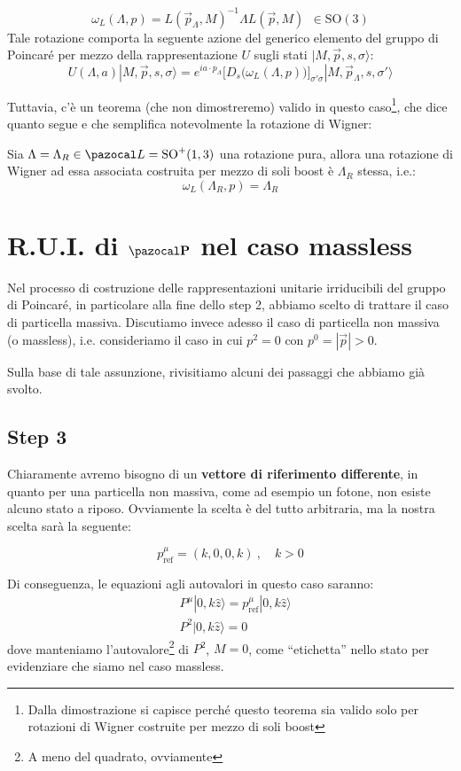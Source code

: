 \documentclass[../main.tex]{subfiles}
\begin{document}
\[
\omega_L(\Lambda, p) = L(\Vec{p}_\Lambda,M)^{-1} \Lambda L(\Vec{p},M) ~~\in \text{SO}(3)
\]
Tale rotazione comporta la seguente azione del generico elemento del gruppo di Poincaré per mezzo della rappresentazione $U$ sugli stati $|M, \Vec{p}, s, \sigma\rangle$:
\[
U(\Lambda,a)|M,\Vec{p},s,\sigma\rangle =e^{ia\cdot p_\Lambda}\Big[D_s\big(\omega_L(\Lambda, p)\big)\Big]_{\sigma'\sigma} |M,\Vec{p}_\Lambda,s,\sigma'\rangle
\]

Tuttavia, c'è un teorema (che non dimostreremo) valido in questo caso\footnote{Dalla dimostrazione si capisce perché questo teorema sia valido solo per rotazioni di Wigner costruite per mezzo di soli boost}, che dice quanto segue e che semplifica notevolmente la rotazione di Wigner:
\begin{theorem}
    Sia $\Lambda=\Lambda_R \in \pazocal L = \text{SO}^+(1,3)$ una rotazione pura, allora una rotazione di Wigner ad essa associata costruita per mezzo di soli boost è \(\Lambda_R\) stessa, i.e.:
    \[
    \omega_L(\Lambda_R, p) = \Lambda_R
    \]
    \label{th:wigner_rot_pure_rot}
\end{theorem}

\section{R.U.I. di $\mathbf{\pazocal P}$ nel caso massless}

Nel processo di costruzione delle rappresentazioni unitarie irriducibili del gruppo di Poincaré, in particolare alla fine dello step 2, abbiamo scelto di trattare il caso di particella massiva. Discutiamo invece adesso il caso di particella non massiva (o massless), i.e. consideriamo il caso in cui $p^2=0$ con $p^0 = |\Vec{p}| > 0$.

Sulla base di tale assunzione, rivisitiamo alcuni dei passaggi che abbiamo già svolto.

\subsection{Step 3}

Chiaramente avremo bisogno di un \textbf{vettore di riferimento differente}, in quanto per una particella non massiva, come ad esempio un fotone, non esiste alcuno stato a riposo. Ovviamente la scelta è del tutto arbitraria, ma la nostra scelta sarà la seguente:

\[
\boxed{p^\mu_\text{ref} = (k,0,0,k)~,\quad k>0}
\]

Di conseguenza, le equazioni agli autovalori in questo caso saranno:
\[
\boxed{
    \begin{aligned}
        &P^\mu|0, k\hat{z}\rangle = p^\mu_\text{ref}|0, k\hat{z}\rangle\\
        &P^2|0, k\hat{z}\rangle = 0
    \end{aligned}
}
\]
dove manteniamo l'autovalore\footnote{A meno del quadrato, ovviamente} di $P^2$, $M=0$, come “etichetta” nello stato per evidenziare che siamo nel caso massless.
\end{document}
